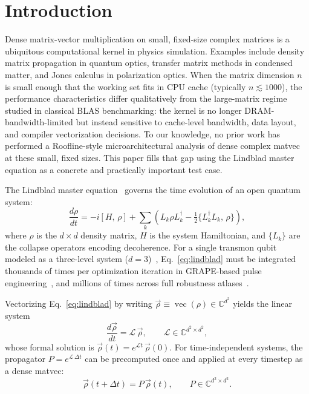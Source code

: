 \documentclass[final,3p,times,twocolumn]{elsarticle}
\newcommand{\comm}[2]{[#1,\,#2]}
\newcommand{\dv}[2]{\frac{d#1}{d#2}}
\begin{document}

\section{Introduction}
\label{sec:intro}

Dense matrix-vector multiplication on small, fixed-size complex matrices is a
ubiquitous computational kernel in physics simulation. Examples include
density matrix propagation in quantum optics, transfer matrix methods in
condensed matter, and Jones calculus in polarization optics. When the matrix
dimension $n$ is small enough that the working set fits in CPU cache
(typically $n \lesssim 1000$), the performance characteristics differ
qualitatively from the large-matrix regime studied in classical BLAS
benchmarking: the kernel is no longer DRAM-bandwidth-limited but instead
sensitive to cache-level bandwidth, data layout, and compiler vectorization
decisions. To our knowledge, no prior work has performed a Roofline-style
microarchitectural analysis of dense complex matvec at these small, fixed
sizes. This paper fills that gap using the Lindblad master equation as a
concrete and practically important test case.

The Lindblad master equation~\cite{Lindblad1976,Gorini1976} governs the
time evolution of an open quantum system:
\begin{equation}
  \label{eq:lindblad}
  \dv{\rho}{t} = -i\comm{H}{\rho}
    + \sum_k \!\left( L_k \rho L_k^\dagger
                    - \tfrac{1}{2}\{L_k^\dagger L_k,\, \rho\} \right),
\end{equation}
where $\rho$ is the $d \times d$ density matrix, $H$ is the system
Hamiltonian, and $\{L_k\}$ are the collapse operators encoding decoherence.
%
For a single transmon qubit modeled as a three-level system
($d = 3$)~\cite{Koch2007}, Eq.~\eqref{eq:lindblad} must be integrated
thousands of times per optimization iteration in GRAPE-based pulse
engineering~\cite{Khaneja2005}, and millions of times across full robustness
atlases~\cite{Malarchick2025QPO}.

Vectorizing Eq.~\eqref{eq:lindblad} by writing $\vec\rho \equiv
\operatorname{vec}(\rho) \in \mathbb{C}^{d^2}$ yields the linear system
\begin{equation}
  \label{eq:lindblad_vec}
  \dv{\vec\rho}{t} = \mathcal{L}\,\vec\rho,
  \qquad \mathcal{L} \in \mathbb{C}^{d^2 \times d^2},
\end{equation}
whose formal solution is $\vec\rho(t) = e^{\mathcal{L} t}\,\vec\rho(0)$.
For time-independent systems, the propagator $P = e^{\mathcal{L}\,\Delta t}$
can be precomputed once and applied at every timestep as a dense matvec:
\begin{equation}
  \label{eq:propagate}
  \vec\rho(t + \Delta t) = P\,\vec\rho(t),
  \qquad P \in \mathbb{C}^{d^2 \times d^2}.
\end{equation}
\end{document}
